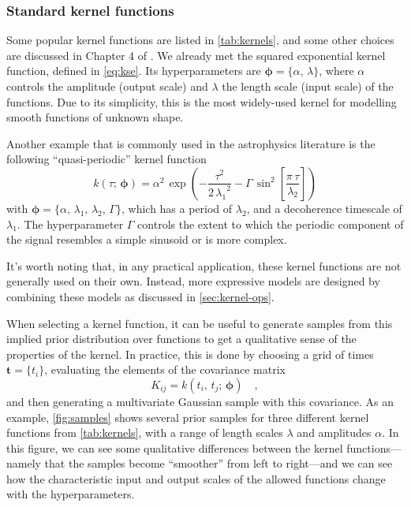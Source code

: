 \documentclass[letterpaper]{ar-1col}
\newcommand{\hyperparams}{\ensuremath{\boldsymbol{\phi}}}
\newcommand{\dt}{\ensuremath{\tau}}
\newcommand{\amplitude}{\ensuremath{\alpha}}
\newcommand{\lengthscale}{\ensuremath{\lambda}}
\begin{document}
\subsubsection{Standard kernel functions}\label{sec:standard-kernels}

Some popular kernel functions are listed in \autoref{tab:kernels}, and some other choices are discussed in Chapter 4 of \citet{gpml}. We already met the 
squared exponential kernel function, defined in \autoref{eq:kse}. Its  hyperparameters are $\hyperparams = \{\amplitude,\,\lengthscale\}$, where $\amplitude$ controls the amplitude (output scale) and $\lengthscale$ the length scale (input scale) of the functions. Due to its simplicity, this is the most widely-used kernel for modelling smooth functions of unknown shape.

Another example that is commonly used in the astrophysics literature \citep{2012MNRAS.419.3147A,2014MNRAS.443.2517H} is the following ``quasi-periodic'' kernel function
\begin{equation}
\label{eq:kqp}
  k(\dt;\,\hyperparams) = \amplitude^2\,\exp\left(-\frac{\dt^2}{2\,{\lengthscale_1}^2} -\Gamma\,\sin^2\left[\frac{\pi\,\dt}{\lengthscale_2}\right] \right)
\end{equation}
with $\hyperparams = \{\amplitude,\,\lengthscale_1,\,\lengthscale_2,\,\Gamma\}$, which has a period of $\lengthscale_2$, and a decoherence timescale of $\lengthscale_1$. The hyperparameter $\Gamma$ controls the extent to which the periodic component of the signal resembles a simple sinusoid or is more complex.

It's worth noting that, in any practical application, these kernel functions are not generally used on their own.
Instead, more expressive models are designed by combining these models as discussed in \autoref{sec:kernel-ops}.

When selecting a kernel function, it can be useful to generate samples from this implied prior distribution over functions to get a qualitative sense of the properties of the kernel.
In practice, this is done by choosing a grid of times $\boldsymbol{t} = \{t_i\}$, evaluating the elements of the covariance matrix
\begin{equation}
  K_{ij} = k(t_i,\,t_j;\,\hyperparams) \quad,
\end{equation}
and then generating a multivariate Gaussian sample with this covariance.
As an example, \autoref{fig:samples} shows several prior samples for three different kernel functions from \autoref{tab:kernels}, with a range of length scales $\lengthscale$ and amplitudes $\amplitude$.
In this figure, we can see some qualitative differences between the kernel functions---namely that the samples become ``smoother'' from left to right---and we can see how the characteristic input and output scales of the allowed functions change with the hyperparameters.
\end{document}
